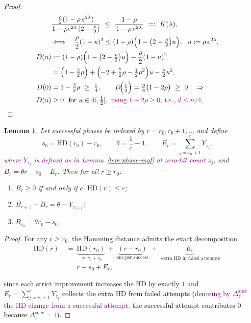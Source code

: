 \documentclass[lettersize,journal]{IEEEtran}
\newcommand{\rerev}[1]{\textcolor{purple}{#1}}
\newcommand{\HD}{\text{HD}}
\newtheorem{lemma}{Lemma}
\begin{document}
{\begin{proof}
\begin{align*}
		&\frac{\tfrac{\rho}{2}(1-\rho\,e^{2\lambda})}{1-\rho e^{2\lambda}\,(2-\tfrac{\rho}{2})}
		\  \le\ \frac{1-\rho}{\,1-\rho\,e^{2\lambda}\,}
		\ =:\ K(\lambda),
		\\&\Longleftrightarrow\quad
		\frac{\rho}{2}(1-u)^2 \le (1-\rho)\Bigl(1-\bigl(2-\tfrac{\rho}{2}\bigr)u\Bigr),\ \ u:=\rho\,e^{2\lambda},
		\\
		D(u)
		&:=(1-\rho)\Bigl(1-\bigl(2-\tfrac{\rho}{2}\bigr)u\Bigr)-\frac{\rho}{2}(1-u)^2
		\\&= \Bigl(1-\tfrac{3}{2}\rho\Bigr)+\Bigl(-2+\tfrac{7}{2}\rho-\tfrac{1}{2}\rho^2\Bigr)u-\tfrac{\rho}{2}u^2,
		\\
		D(0)&=1-\tfrac{3}{2}\rho\ \ge\ \tfrac14,\qquad
		D\!\Big(\tfrac12\Big)=\tfrac{\rho}{8}\bigl(1-2\rho\bigr)\ \ge\ 0
		\quad\Rightarrow\quad \\
		D(u)&\ge 0\ \text{ for }u\in[0,\tfrac12]\rerev{,\text{ using }1-2\rho\ge 0\text{, i.e., }d\le n/4},
	\end{align*}
	
	
\end{proof}


\setcounter{theorem}{6}
\begin{lemma}%
	Let successful phases be indexed by $r=r_0,r_0+1,\dots$ and define
	\[
	s_0=\mathrm{HD}(r_0)-r_0, \qquad 
	\theta=\frac{1}{c}-1, \qquad
	E_r=\sum_{j=r_0+1}^{r} Y_{z_j},
	\]
\rerev{where $Y_{z_j}$ is defined as in Lemma~\ref{lem:phase-mgf} at zero-bit count $z_j$,}	and $B_r = \theta r - s_0 - E_r$.
	Then for all $r\ge r_0$:
	\begin{enumerate}
		\item 
		$B_r\ge0$ if and only if $c\cdot\mathrm{HD}(r)\le r$;
		\item 
		$B_{r+1}-B_r=\theta-Y_{z_{r+1}}$;
		\item 
		$B_{r_0}=\theta r_0 - s_0$.
	\end{enumerate}
\end{lemma}

\begin{proof}
	For any $r\ge r_0$, the Hamming distance admits the exact decomposition
	\begin{align*}
		\HD(r)\ &=\ \underbrace{\HD(r_0)}_{=\,r_0+s_0}\ +\ \underbrace{(r-r_0)}_{\text{one per success}}\ +\ \underbrace{E_r}_{\text{ extra HD in failed attempts}}
		\ \\&=\ r+s_0+E_r,		
	\end{align*}
	
	since each strict improvement increases the HD by exactly $1$ and $E_r=\sum_{j=r_0+1}^r Y_{z_j}$ collects the extra HD from failed attempts (\rerev{denoting by $\Delta_z^{\mathrm{succ}}$ the HD change from a successful attempt,} the successful attempt contributes $0$ because $\Delta_z^{\mathrm{succ}}=1$).
	

\end{proof}}
\end{document}
